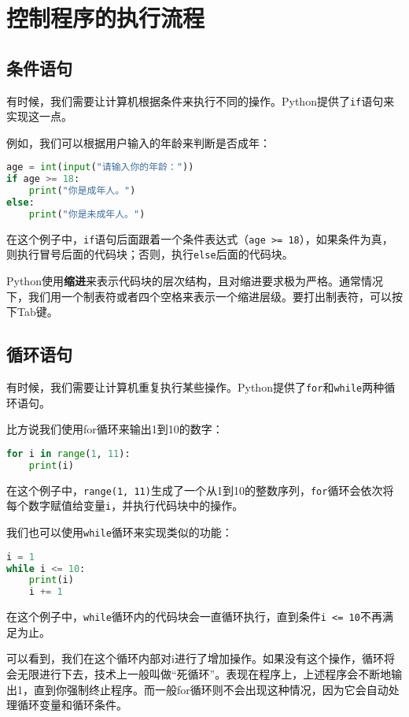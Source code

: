 \documentclass[../main.tex]{subfiles}
\begin{document}
\section{控制程序的执行流程}

\subsection{条件语句}

有时候，我们需要让计算机根据条件来执行不同的操作。Python提供了\texttt{if}语句来实现这一点。

例如，我们可以根据用户输入的年龄来判断是否成年：
\begin{lstlisting}[language=python]
age = int(input("请输入你的年龄："))
if age >= 18:
    print("你是成年人。")
else:
    print("你是未成年人。")
\end{lstlisting}
在这个例子中，\texttt{if}语句后面跟着一个条件表达式（\texttt{age >= 18}），如果条件为真，则执行冒号后面的代码块；否则，执行\texttt{else}后面的代码块。

Python使用\textbf{缩进}来表示代码块的层次结构，且对缩进要求极为严格。通常情况下，我们用一个制表符或者四个空格来表示一个缩进层级。要打出制表符，可以按下Tab键。

\subsection{循环语句}

有时候，我们需要让计算机重复执行某些操作。Python提供了\texttt{for}和\texttt{while}两种循环语句。

比方说我们使用for循环来输出1到10的数字：
\begin{lstlisting}[language=python]
for i in range(1, 11):
    print(i)
\end{lstlisting}
在这个例子中，\texttt{range(1, 11)}生成了一个从1到10的整数序列，\texttt{for}循环会依次将每个数字赋值给变量\texttt{i}，并执行代码块中的操作。

我们也可以使用\texttt{while}循环来实现类似的功能：
\begin{lstlisting}[language=python]
i = 1
while i <= 10:
    print(i)
    i += 1
\end{lstlisting}
在这个例子中，\texttt{while}循环内的代码块会一直循环执行，直到条件\texttt{i <= 10}不再满足为止。

可以看到，我们在这个循环内部对i进行了增加操作。如果没有这个操作，循环将会无限进行下去，技术上一般叫做“死循环”。表现在程序上，上述程序会不断地输出1，直到你强制终止程序。而一般for循环则不会出现这种情况，因为它会自动处理循环变量和循环条件。
\end{document}
